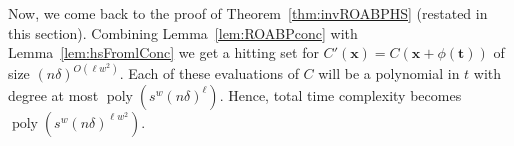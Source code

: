 \documentclass[final,oneeqnum, onethmnum, onefignum]{siamltex1213}
\newcommand{\F}{\mathbb F}
\newcommand{\comment}[1]{}
\DeclareMathOperator{\poly}{poly}
\newcommand{\x}{\mathbf{x}}
\begin{document}
Now, we come back to the proof of Theorem~\ref{thm:invROABPHS} (restated in this section).
Combining Lemma~\ref{lem:ROABPconc} with Lemma~\ref{lem:hsFromlConc} we get a hitting set
for $C'(\x) = C(\x + \phi(\mathbf{t}))$ of size $(n \delta)^{O(\ell w^2)}$.
Each of these evaluations of $C$ will be a polynomial in $t$ 
with degree at most $\poly(s^w (n \delta)^{\ell})$.
Hence, total time complexity becomes $\poly(s^w(n \delta)^{\ell w^2})$. 

\comment{
Note that for constant width ROABP,
when $\mu(D_i)$ is bounded by a constant for each $0 \leq i \leq d+1$,
in particular when each $D_i$ is univariate, 
the parameter $\ell$ becomes constant and
the hitting-set becomes polynomial-time.  
}
\end{document}
